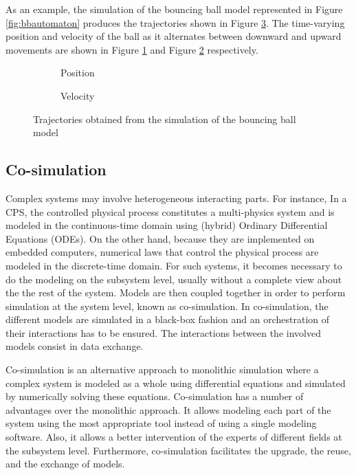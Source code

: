 As an example, the simulation of the bouncing ball model represented in Figure \ref{fig:bbautomaton} produces the trajectories shown in Figure \ref{fig:bbsim}. The time-varying position and velocity of the ball as it alternates between downward and upward movements are shown in Figure \ref{fig:bbpos} and Figure \ref{fig:bbve} respectively.

\begin{figure}[phtb]
\centering
\begin{subfigure}{\textwidth}
  \centering
  
  \caption{Position}
  \label{fig:bbpos}
\end{subfigure}

\begin{subfigure}{\textwidth}
  \centering
  
  \caption{Velocity}
  \label{fig:bbve}
\end{subfigure}
\caption{Trajectories obtained from the simulation of the bouncing ball model}
\label{fig:bbsim}
\end{figure}

\subsection{Co-simulation}

Complex systems may involve heterogeneous interacting parts. For instance, In a CPS, the controlled physical process constitutes a multi-physics system and is modeled in the continuous-time domain using (hybrid) Ordinary Differential Equations (ODEs). On the other hand, because they are implemented on embedded computers, numerical laws that control the physical process are modeled in the discrete-time domain. For such systems, it becomes necessary to do the modeling on the subsystem level, usually without a complete view about the the rest of the system. Models are then coupled together in order to perform simulation at the system level, known as co-simulation. In co-simulation, the different models are simulated in a black-box fashion and an orchestration of their interactions has to be ensured. The interactions between the involved models consist in data exchange.

Co-simulation is an alternative approach to monolithic simulation where a complex system is modeled as a whole using differential equations and simulated by numerically solving these equations. Co-simulation has a number of advantages over the monolithic approach. It allows modeling each part of the system using the most appropriate tool instead of using a single modeling software. Also, it allows a better intervention of the experts of different fields at the subsystem level. Furthermore, co-simulation facilitates the upgrade, the reuse, and the exchange of models. 

